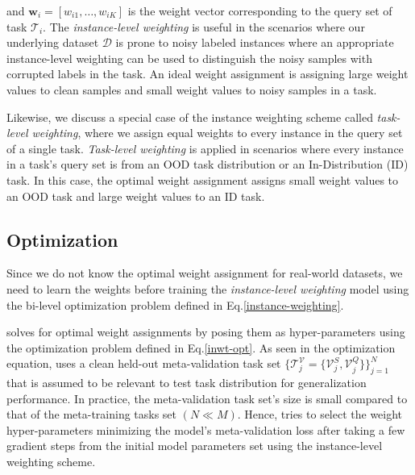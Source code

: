 and $\mathbf{w}_{i} = [w_{i1}, \dots, w_{iK}]$ is the weight vector corresponding to the query set of task $\mathcal{T}_i$. The \textit{instance-level weighting} is useful in the scenarios where our underlying dataset $\mathcal{D}$ is prone to noisy labeled instances where an appropriate instance-level weighting can be used to distinguish the noisy samples with corrupted labels in the task. An ideal weight assignment is assigning large weight values to clean samples and small weight values to noisy samples in a task. 
 
Likewise, we discuss a special case of the instance weighting scheme called \textit{task-level weighting}, where we assign equal weights to every instance in the query set of a single task. \textit{Task-level weighting} is applied in scenarios where every instance in a task's query set is from an OOD task distribution or an In-Distribution (ID) task. In this case, the optimal weight assignment assigns small weight values to an OOD task and large weight values to an ID task.
\vspace{-1ex}
\subsection{\textsc{\biopt{}} Optimization}
Since we do not know the optimal weight assignment for real-world datasets, we need to learn the weights before training the \textit{instance-level weighting} model using the bi-level optimization problem defined in Eq.\eqref{instance-weighting}.

\sysname{} solves for optimal weight assignments by posing them as hyper-parameters using the optimization problem defined in Eq.\eqref{inwt-opt}. As seen in the optimization equation, \sysname{} uses a clean held-out meta-validation task set $\{\mathcal{T}^{\mathcal{V}}_{j}= \{\mathcal{V}_{j}^{S}, \mathcal{V}_{j}^{Q}\} \}_{j = 1} ^ {N}$ that is assumed to be relevant to test task distribution for generalization performance. In practice, the meta-validation task set's size is small compared to that of the meta-training tasks set $(N \ll M)$.  Hence, \sysname{} tries to select the weight hyper-parameters minimizing the model's meta-validation loss after taking a few gradient steps from the initial model parameters set using the instance-level weighting scheme.


